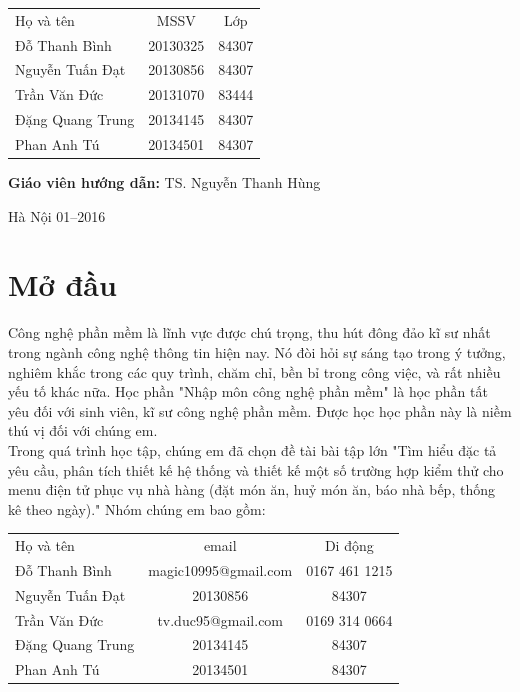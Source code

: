 \documentclass[a4paper,12pt]{report}
\begin{document}
\begin{longtable}{l c c}

Họ và tên & MSSV  & Lớp\\
Đỗ Thanh Bình & 20130325 & 84307 \\
Nguyễn Tuấn Đạt &  20130856 & 84307 \\
Trần Văn  Đức & 20131070 & 83444 \\
Đặng Quang Trung & 20134145  & 84307 \\
Phan Anh Tú & 20134501  & 84307 \\

\end{longtable}

\hspace{1cm}\fontsize{14}{16}\selectfont \textbf{Giáo viên hướng dẫn: }TS. Nguyễn Thanh Hùng\\[2cm]
\begin{center}
\fontsize{16}{19}\selectfont Hà Nội 01--2016

\end{center}
\newpage
\tableofcontents
\chapter*{Mở đầu}
Công nghệ phần mềm là lĩnh vực được chú trọng, thu hút đông đảo kĩ sư nhất trong ngành công nghệ thông tin hiện nay. Nó đòi hỏi sự sáng tạo trong ý tưởng, nghiêm khắc trong các quy trình, chăm chỉ, bền bỉ trong công việc, và rất nhiều yếu tố khác nữa. Học phần "Nhập môn công nghệ phần mềm" là học phần tất yêu đối với sinh viên, kĩ sư công nghệ phần mềm. Được học học phần này là niềm thú vị đối với chúng em.\\

Trong quá trình học tập, chúng em đã chọn đề tài bài tập lớn "Tìm	hiểu đặc	tả yêu	cầu,	phân	tích	thiết	kế hệ thống	và	thiết	kế một	số
trường	hợp	kiểm	thử cho menu	điện	tử phục	vụ nhà	hàng (đặt	món	ăn,	huỷ món	
ăn,	báo	nhà	bếp,	thống	kê	theo	ngày)." Nhóm chúng em bao gồm:\\
\begin{longtable}{l c c}

Họ và tên & email  & Di động\\
Đỗ Thanh Bình & magic10995@gmail.com & 0167 461 1215 \\
Nguyễn Tuấn Đạt &  20130856 & 84307 \\
Trần Văn  Đức & tv.duc95@gmail.com & 0169 314 0664 \\
Đặng Quang Trung & 20134145  & 84307 \\
Phan Anh Tú & 20134501  & 84307 \\
\end{longtable}
\end{document}
